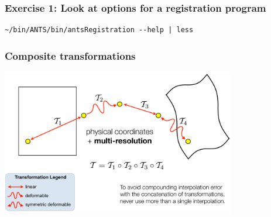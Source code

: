 

\begin{frame}
\frametitle{Exercise 1: Look at options for a registration program}
\begin{verbatim}
~/bin/ANTS/bin/antsRegistration --help | less
\end{verbatim}
\end{frame}

\begin{frame}
\frametitle{Composite transformations}
\includegraphics[height=2.5in]{../Art/composite}
\end{frame}

